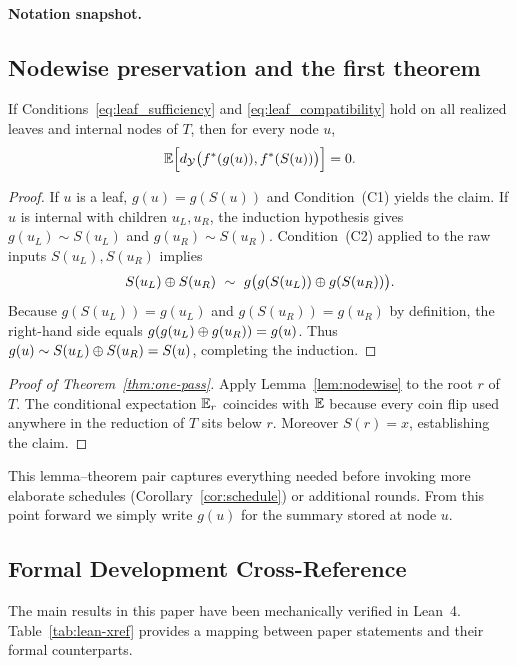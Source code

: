 \paragraph{Notation snapshot.}
\subsection{Nodewise preservation and the first theorem}

\begin{lemma}\label{lem:nodewise}
If Conditions~\eqref{eq:leaf_sufficiency} and \eqref{eq:leaf_compatibility} hold on all realized leaves and internal nodes of $T$, then for every node $u$,
\[
\mathbb{E}\Big[d_{\mathcal{Y}}\big(f^{\ast}(g(u)),f^{\ast}(S(u))\big)\Big]=0.
\]
\end{lemma}

\begin{proof}
If $u$ is a leaf, $g(u)=g(S(u))$ and Condition~(C1) yields the claim. If $u$ is internal with children $u_L,u_R$, the induction hypothesis gives $g(u_L)\sim S(u_L)$ and $g(u_R)\sim S(u_R)$. Condition~(C2) applied to the raw inputs $S(u_L),S(u_R)$ implies
\[
S(u_L)\concat S(u_R)\ \sim\ g\big(g(S(u_L))\concat g(S(u_R))\big).
\]
Because $g(S(u_L))=g(u_L)$ and $g(S(u_R))=g(u_R)$ by definition, the right-hand side equals $g(g(u_L)\oplus g(u_R))=g(u)$. Thus $g(u)\sim S(u_L)\oplus S(u_R)=S(u)$, completing the induction.
\end{proof}

\begin{proof}[Proof of Theorem~\ref{thm:one-pass}]
\label{proof:thm-one-pass}
Apply Lemma~\ref{lem:nodewise} to the root $r$ of $T$. The conditional expectation $\mathbb{E}_r$ coincides with $\mathbb{E}$ because every coin flip used anywhere in the reduction of $T$ sits below $r$. Moreover $S(r)=x$, establishing the claim.
\end{proof}

This lemma–theorem pair captures everything needed before invoking more elaborate schedules (Corollary~\ref{cor:schedule}) or additional rounds. From this point forward we simply write $g(u)$ for the summary stored at node $u$.

\subsection{Formal Development Cross-Reference}

The main results in this paper have been mechanically verified in Lean~4. Table~\ref{tab:lean-xref} provides a mapping between paper statements and their formal counterparts.

